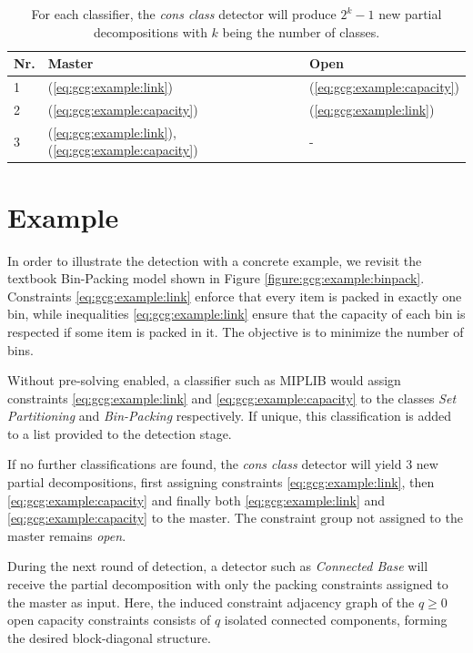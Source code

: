 		\begin{table}[ht!]
			\centering
			\begin{tabular}{l|l|l}
				\textbf{Nr.} & \textbf{Master} & \textbf{Open} \\
				\toprule
				\toprule
				1 & (\ref{eq:gcg:example:link}) & (\ref{eq:gcg:example:capacity}) \\ 
				2 & (\ref{eq:gcg:example:capacity}) & (\ref{eq:gcg:example:link}) \\
				3 & (\ref{eq:gcg:example:link}), (\ref{eq:gcg:example:capacity}) & -
			\end{tabular}
			\caption{For each classifier, the \textit{cons class} detector will produce $2^k - 1$ new partial decompositions with $k$ being the number of classes.}
			\label{table:gcg:example:consclass}
		\end{table}
	
		\clearpage
	
	\section{Example}
	\label{chap:gcg:example}
		
		In order to illustrate the detection with a concrete example, we revisit the textbook Bin-Packing model shown in Figure \ref{figure:gcg:example:binpack}.
		Constraints \ref{eq:gcg:example:link} enforce that every item is packed in exactly one bin, while inequalities \ref{eq:gcg:example:link} ensure that the capacity of each bin is respected if some item is packed in it.
		The objective is to minimize the number of bins.
		
		Without pre-solving enabled, a classifier such as MIPLIB would assign constraints \ref{eq:gcg:example:link} and \ref{eq:gcg:example:capacity} to the classes \textit{Set Partitioning} and \textit{Bin-Packing} respectively.
		If unique, this classification is added to a list provided to the detection stage.
		
		If no further classifications are found, the \textit{cons class} detector will yield 3 new partial decompositions, first assigning constraints \ref{eq:gcg:example:link}, then \ref{eq:gcg:example:capacity} and finally both \ref{eq:gcg:example:link} and \ref{eq:gcg:example:capacity} to the master.
		The constraint group not assigned to the master remains \textit{open}.
		
		During the next round of detection, a detector such as \textit{Connected Base} will receive the partial decomposition with only the packing constraints assigned to the master as input.
		Here, the induced constraint adjacency graph of the $q \ge 0$ open capacity constraints consists of $q$ isolated connected components, forming the desired block-diagonal structure.
		
		